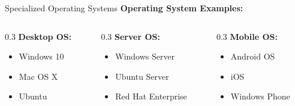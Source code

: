 \documentclass[aspectratio=169]{beamer}
\begin{document}
\begin{frame}{Specialized Operating Systems}
    \textbf{Operating System Examples:}
    \begin{columns}
        \begin{column}{0.3\textwidth}
            \textbf{Desktop OS:}
            \begin{itemize}
                \item Windows 10
                \item Mac OS X
                \item Ubuntu
            \end{itemize}
        \end{column}
        \begin{column}{0.3\textwidth}
            \textbf{Server OS:}
            \begin{itemize}
                \item Windows Server
                \item Ubuntu Server
                \item Red Hat Enterprise
            \end{itemize}
        \end{column}
        \begin{column}{0.3\textwidth}
            \textbf{Mobile OS:}
            \begin{itemize}
                \item Android OS
                \item iOS
                \item Windows Phone
            \end{itemize}
        \end{column}
    \end{columns}
\end{frame}
\end{document}

